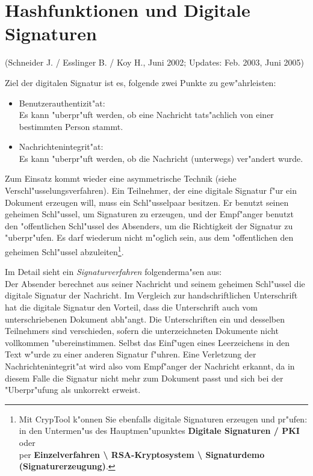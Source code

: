
\newpage
\hypertarget{Chapter_Hashes-and-Digital-Signatures}{}
\section{Hashfunktionen und Digitale Signaturen}
\label{Chapter_Hashes-and-Digital-Signatures}
(Schneider J. / Esslinger B. / Koy H., Juni 2002; 
Updates: Feb. 2003, Juni 2005)

\vspace{12pt}
Ziel der digitalen Signatur ist es, folgende zwei Punkte zu gew"ahrleisten:
\begin{itemize}
 \item Benutzerauthentizit"at:  \\
      Es kann "uberpr"uft werden, ob eine Nachricht tats"achlich
      von einer bestimmten Person stammt.
 \item Nachrichtenintegrit"at:  \\
      Es kann "uberpr"uft werden, ob die Nachricht (unterwegs) 
      ver"andert wurde.
\end{itemize}


Zum Einsatz kommt wieder eine asymmetrische Technik (siehe 
Verschl"usselungsverfahren).
Ein Teilnehmer, der eine digitale Signatur f"ur ein Dokument erzeugen will,
muss ein Schl"usselpaar besitzen. Er benutzt seinen geheimen Schl"ussel,
um Signaturen zu erzeugen, und der Empf"anger benutzt den "offentlichen
Schl"ussel des Absenders, um die Richtigkeit der Signatur zu "uberpr"ufen.
Es darf wiederum nicht m"oglich sein, aus dem "offentlichen den geheimen
Schl"ussel abzuleiten\footnote{%
Mit CrypTool k"onnen Sie ebenfalls digitale Signaturen
erzeugen und pr"ufen: \\
in den Untermen"us des Hauptmen"upunktes 
{\bf Digitale Signaturen / PKI} oder \\
per 
{\bf Einzelverfahren \textbackslash{} RSA-Kryptosystem \textbackslash{}
Signaturdemo (Signaturerzeugung)}.
}.


Im Detail sieht ein  {\em Signaturverfahren} 
folgenderma"sen aus: \\
Der Absender berechnet aus seiner Nachricht und seinem geheimen Schl"ussel
die digitale Signatur der Nachricht. Im Vergleich zur handschriftlichen
Unterschrift hat die digitale Signatur den Vorteil, dass die 
Unterschrift auch vom unterschriebenen Dokument abh"angt. Die Unterschriften
ein und desselben Teilnehmers sind verschieden, sofern die unterzeichneten
Dokumente nicht vollkommen "ubereinstimmen. Selbst das Einf"ugen eines
Leerzeichens in den Text w"urde zu einer anderen Signatur f"uhren. Eine
Verletzung der Nachrichtenintegrit"at wird also vom Empf"anger der 
Nachricht erkannt, da in diesem Falle die Signatur nicht mehr zum Dokument
passt und sich bei der "Uberpr"ufung als unkorrekt erweist.

